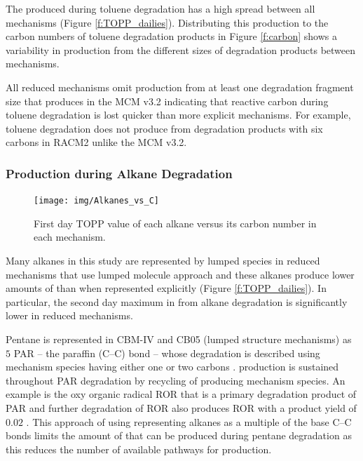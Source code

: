 The  produced during toluene degradation has a high spread between all mechanisms (Figure \ref{f:TOPP_dailies}).
Distributing this  production to the carbon numbers of toluene degradation products in Figure \ref{f:carbon} shows a variability in  production from the different sizes of degradation products between mechanisms.

All reduced mechanisms omit  production from at least one degradation fragment size that produces  in the MCM v3.2 indicating that reactive carbon during toluene degradation is lost quicker than more explicit mechanisms.
For example, toluene degradation does not produce  from degradation products with six carbons in RACM2 unlike the MCM v3.2.

%

\subsubsection[Ox Production during Alkane Degradation]{ Production during Alkane Degradation} \label{sss:alkanes}

\begin{figure}
    \centering
    \texttt{[image: img/Alkanes\_vs\_C]}
    \vspace{0mm}
    \caption{First day TOPP value of each alkane versus its carbon number in each mechanism.}
    \vspace{-4mm}
    \label{f:alkanes_C}
\end{figure}

Many alkanes in this study are represented by lumped species in reduced mechanisms that use lumped molecule approach and these alkanes produce lower amounts of  than when represented explicitly (Figure \ref{f:TOPP_dailies}).
In particular, the second day maximum in  from alkane degradation is significantly lower in reduced mechanisms.

Pentane is represented in CBM-IV and CB05 (lumped structure mechanisms) as $5$ PAR -- the paraffin (C--C) bond -- whose degradation is described using mechanism species having either one or two carbons \citep{Gery:1989, Yarwood:2005}. 
 production is sustained throughout PAR degradation by recycling of  producing mechanism species.
An example is the oxy organic radical ROR that is a primary degradation product of PAR and further degradation of ROR also produces ROR with a product yield of $0.02$ \citep{Gery:1989}.
This approach of using representing alkanes as a multiple of the base C--C bonds limits the amount of  that can be produced during pentane degradation as this reduces the number of available pathways for  production.

